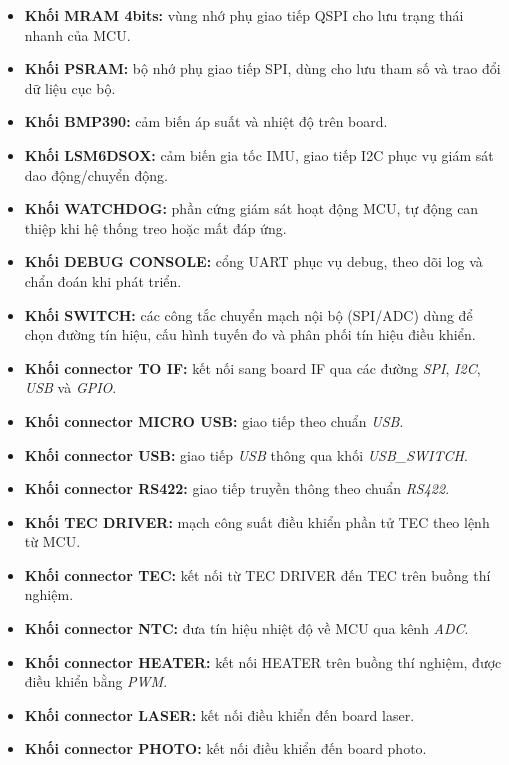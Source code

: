 \begin{itemize}
    \item \textbf{Khối MRAM 4bits:} vùng nhớ phụ giao tiếp QSPI cho lưu trạng thái nhanh của MCU.

    \item \textbf{Khối PSRAM:} bộ nhớ phụ giao tiếp SPI, dùng cho lưu tham số và trao đổi dữ liệu cục bộ.

    \item \textbf{Khối BMP390:} cảm biến áp suất và nhiệt độ trên board.

    \item \textbf{Khối LSM6DSOX:} cảm biến gia tốc IMU, giao tiếp I2C phục vụ giám sát dao động/chuyển động.

    \item \textbf{Khối WATCHDOG:} phần cứng giám sát hoạt động MCU, tự động can thiệp khi hệ thống treo hoặc mất đáp ứng.

    \item \textbf{Khối DEBUG CONSOLE:} cổng UART phục vụ debug, theo dõi log và chẩn đoán khi phát triển.

    \item \textbf{Khối SWITCH:} các công tắc chuyển mạch nội bộ (SPI/ADC) dùng để chọn đường tín hiệu, cấu hình tuyến đo và phân phối tín hiệu điều khiển.

    \item \textbf{Khối connector TO IF:} kết nối sang board IF qua các đường \textit{SPI}, \textit{I2C}, \textit{USB} và \textit{GPIO}.

    \item \textbf{Khối connector MICRO USB:} giao tiếp theo chuẩn \textit{USB}.

    \item \textbf{Khối connector USB:} giao tiếp \textit{USB} thông qua khối \textit{USB\_SWITCH}.

    \item \textbf{Khối connector RS422:} giao tiếp truyền thông theo chuẩn \textit{RS422}.
    
    \item \textbf{Khối TEC DRIVER:} mạch công suất điều khiển phần tử TEC theo lệnh từ MCU.

    \item \textbf{Khối connector TEC:} kết nối từ TEC DRIVER đến TEC trên buồng thí nghiệm.

    \item \textbf{Khối connector NTC:} đưa tín hiệu nhiệt độ về MCU qua kênh \textit{ADC}.

    \item \textbf{Khối connector HEATER:} kết nối HEATER trên buồng thí nghiệm, được điều khiển bằng \textit{PWM}. 

    \item \textbf{Khối connector LASER:} kết nối điều khiển đến board laser.

    \item \textbf{Khối connector PHOTO:} kết nối điều khiển đến board photo.
\end{itemize}

